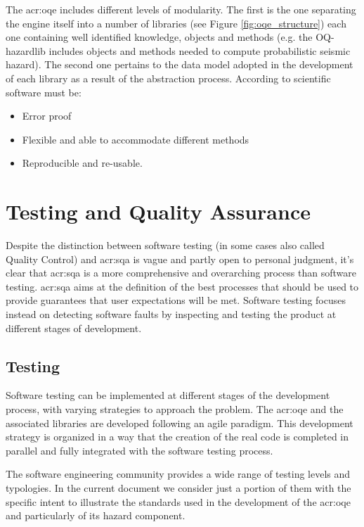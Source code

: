% 
The \gls{acr:oqe} includes different levels of modularity. 
The first is the one separating the engine itself into a number of 
libraries (see Figure \ref{fig:oqe_structure}) each one containing well 
identified knowledge, objects and methods (e.g. the OQ-hazardlib  
includes objects and methods needed to compute probabilistic 
seismic hazard). 
% 
The second one pertains to the data model adopted in the development 
of each library as a result of the abstraction process.
%
According to \textcite{berkes2012} scientific software must be:
\begin{itemize}
\item Error proof
\item Flexible and able to accommodate different methods
\item Reproducible and re-usable. 
\end{itemize}
%
\section{Testing and Quality Assurance}
Despite the distinction between software testing (in some cases also called 
Quality Control) and \gls{acr:sqa} is vague and partly open to personal 
judgment, it's clear that \gls{acr:sqa} is a more comprehensive and 
overarching process than software testing. 
%
\gls{acr:sqa} aims at the definition of the best processes  
that should be used to provide guarantees that user expectations will 
be met. 
% 
Software testing focuses instead on detecting software faults by inspecting 
and testing the product at different stages of development.
%
\subsection{Testing}
Software testing can be implemented at different stages of the development 
process, with varying strategies to approach the problem.
%
The \gls{acr:oqe} and the associated libraries are developed following an 
agile paradigm. This development strategy is organized in a way that 
the creation of the real code is completed in parallel and fully 
integrated with the software testing process.

The software engineering community provides a wide range of testing levels
and typologies. In the current document we consider just a portion of them
with the specific intent to illustrate the standards used in the 
development of the \gls{acr:oqe} and particularly of its hazard component.
%
